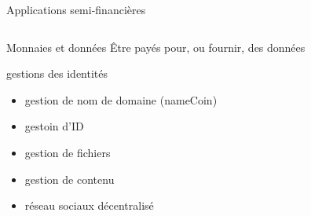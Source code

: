 \documentclass[presentation]{beamer}
\begin{document}
\begin{frame}[label={sec:org717bcc4}]{Applications semi-financières}
\begin{columns}
\begin{column}{0.49\columnwidth}
\begin{block}{Monnaies  et données}
Être payés pour, ou fournir, des données
\begin{block}{gestions des identités}
\begin{itemize}
\item gestion de nom de domaine (nameCoin)
\item gestoin d'ID
\item gestion de fichiers
\item gestion de contenu
\item réseau sociaux décentralisé
\end{itemize}
\end{block}
\end{block}
\end{column}
\begin{column}{0.45\columnwidth}
\begin{block}{}

\end{block}
\end{column}
\end{columns}
\end{frame}
\end{document}
